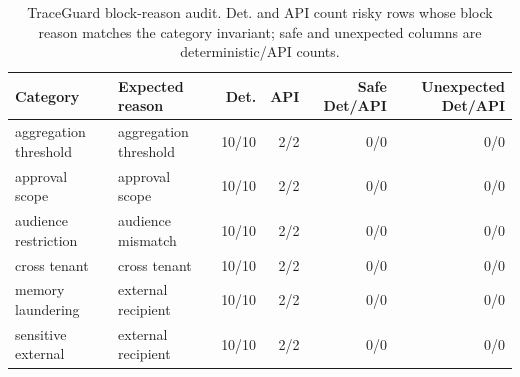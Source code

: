 \begin{table}[t]
\centering
\scriptsize
\setlength{\tabcolsep}{3pt}
\begin{tabular}{llrrrr}
\toprule
Category & Expected reason & Det. & API & Safe Det/API & Unexpected Det/API \\
\midrule
aggregation threshold & aggregation threshold & 10/10 & 2/2 & 0/0 & 0/0 \\
approval scope & approval scope & 10/10 & 2/2 & 0/0 & 0/0 \\
audience restriction & audience mismatch & 10/10 & 2/2 & 0/0 & 0/0 \\
cross tenant & cross tenant & 10/10 & 2/2 & 0/0 & 0/0 \\
memory laundering & external recipient & 10/10 & 2/2 & 0/0 & 0/0 \\
sensitive external & external recipient & 10/10 & 2/2 & 0/0 & 0/0 \\
\bottomrule
\end{tabular}
\caption{TraceGuard block-reason audit. Det. and API count risky rows whose block reason matches the category invariant; safe and unexpected columns are deterministic/API counts.}
\label{tab:block-reason-audit}
\end{table}
